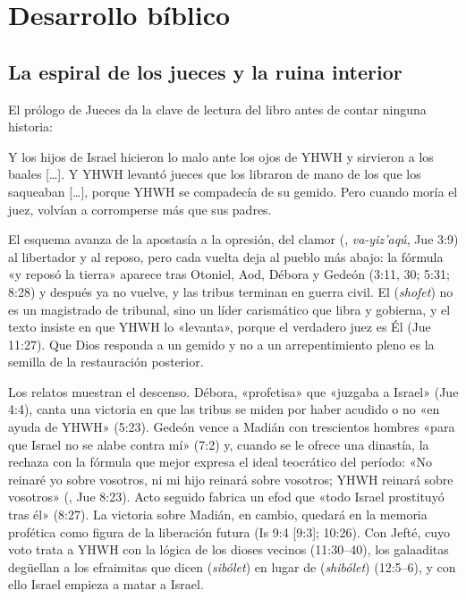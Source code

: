 \section{Desarrollo bíblico}

\subsection{La espiral de los jueces y la ruina interior}
El prólogo de Jueces da la clave de lectura del libro antes de contar ninguna historia:

\begin{cita}Y los hijos de Israel hicieron lo malo ante los ojos de YHWH y sirvieron a los baales [\ldots]. Y YHWH levantó jueces que los libraron de mano de los que los saqueaban [\ldots], porque YHWH se compadecía de su gemido. Pero cuando moría el juez, volvían a corromperse más que sus padres.\end{cita}

El esquema avanza de la apostasía a la opresión, del clamor (, \emph{va-yiz'aqú}, Jue 3:9) al libertador y al reposo, pero cada vuelta deja al pueblo más abajo: la fórmula «y reposó la tierra» aparece tras Otoniel, Aod, Débora y Gedeón (3:11, 30; 5:31; 8:28) y después ya no vuelve, y las tribus terminan en guerra civil. El  (\emph{shofet}) no es un magistrado de tribunal, sino un líder carismático que libra y gobierna, y el texto insiste en que YHWH lo «levanta», porque el verdadero juez es Él (Jue 11:27). Que Dios responda a un gemido y no a un arrepentimiento pleno es la semilla de la restauración posterior.

Los relatos muestran el descenso. Débora, «profetisa» que «juzgaba a Israel» (Jue 4:4), canta una victoria en que las tribus se miden por haber acudido o no «en ayuda de YHWH» (5:23). Gedeón vence a Madián con trescientos hombres «para que Israel no se alabe contra mí» (7:2) y, cuando se le ofrece una dinastía, la rechaza con la fórmula que mejor expresa el ideal teocrático del período: «No reinaré yo sobre vosotros, ni mi hijo reinará sobre vosotros; YHWH reinará sobre vosotros» (, Jue 8:23). Acto seguido fabrica un efod que «todo Israel prostituyó tras él» (8:27). La victoria sobre Madián, en cambio, quedará en la memoria profética como figura de la liberación futura (Is 9:4 [9:3]; 10:26). Con Jefté, cuyo voto trata a YHWH con la lógica de los dioses vecinos (11:30--40), los galaaditas degüellan a los efraimitas que dicen  (\emph{sibólet}) en lugar de  (\emph{shibólet}) (12:5--6), y con ello Israel empieza a matar a Israel.

